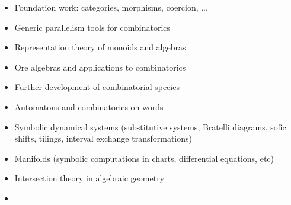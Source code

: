 \begin{itemize}
\item Foundation work: categories, morphisms, coercion, ...
\item Generic parallelism tools for combinatorics
\item Representation theory of monoids and algebras
\item Ore algebras and applications to combinatorics
\item Further development of combinatorial species
\item Automatons and combinatorics on words
\item Symbolic dynamical systems (substitutive systems, Bratelli diagrams,
  sofic shifts, tilings, interval exchange transformations)
\item Manifolds (symbolic computations in charts, differential equations, etc)
\item Intersection theory in algebraic geometry
\item {}
\end{itemize}

